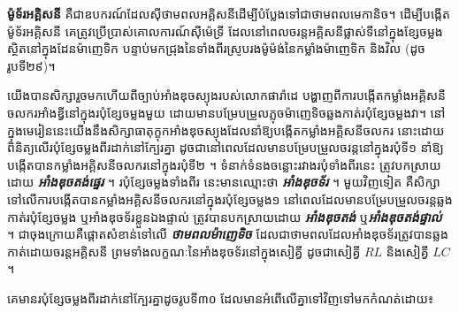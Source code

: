 
\textbf{\textcolor{brownheader}{ម៉ូទ័រអគ្គិសនី}} គឺជាឧបករណ៍ដែលស៊ីថាមពលអគ្គិសនីដើម្បីបំប្លែងទៅជាថាមពលមេកានិច។ ដើម្បីបង្កើតម៉ូទ័រអគ្គិសនី គេត្រូវប្រើប្រាស់គោលការណ៍ស៊ីម៉េទ្រី ដែលនៅពេលចរន្តអគ្គិសនីផ្លាស់ទីនៅក្នុងខ្សែចម្លងស្ថិតនៅក្នុងដែនម៉ាញេទិក បន្ទាប់មកជ្រុងនៃទាំងពីរស្រូបរងម៉ូម៉ង់នៃកម្លាំងម៉ាញេទិក និងវិល (ដូចរូបទី២៩)។

\vspace{0.5em}
\begin{center}
\end{center}

\clearpage

\tanbgdivider

យើងបានសិក្សារួចមកហើយពីច្បាប់អាំងឌុចស្យុងរបស់លោកផារ៉ាដេ បង្ហាញពីការបង្កើតកម្លាំងអគ្គិសនីចលករអាំងឌ្វីនៅក្នុងរបុំខ្សែចម្លងមួយ ដោយមានបម្រែបម្រួលភ្លុចម៉ាញេទិចឆ្លងកាត់របុំខ្សែចម្លងវា។ នៅក្នុងមេរៀននេះយើងនឹងសិក្សាធាតុក្ខុកអាំងឌុចស្យុងដែលនាំឱ្យបង្កើតកម្លាំងអគ្គិសនីចលករ នោះដោយពិនិត្យលើរបុំខ្សែចម្លងពីរដាក់នៅក្បែរគ្នា ដូចជានៅពេលដែលមានបម្រែបម្រួលចរន្តនៅក្នុងរបុំទី១ នាំឱ្យបង្កើតបានកម្លាំងអគ្គិសនីចលករនៅក្នុងរបុំទី២ ។ ទំនាក់ទំនងចន្លោះរវាងរបុំទាំងពីរនេះ ត្រូវបកស្រាយដោយ \textbf{\textit{អាំងឌុចតង់ផ្ទេរ}} ។ របុំខ្សែចម្លងទាំងពីរ នេះមានឈ្មោះថា \textbf{\textit{អាំងឌុចទ័រ}} ។ មួយវិញទៀត គឺសិក្សាទៅលើការបង្កើតបានកម្លាំងអគ្គិសនីចលករនៅក្នុងរបុំខ្សែចម្លង១ នៅពេលដែលមានបម្រែបម្រួលចរន្តឆ្លងកាត់របុំខ្សែចម្លង ឬអាំងឌុចទ័រខ្លួនឯងផ្ទាល់ ត្រូវបានបកស្រាយដោយ \textbf{\textit{អាំងឌុចតង់}} ឬ\textbf{\textit{អាំងឌុចតង់ផ្ទាល់}} ។ ជាចុងក្រោយគឺផ្តោតសំខាន់ទៅលើ \textbf{\textit{ថាមពលម៉ាញេទិច}} ដែលជាថាមពលដែលអាំងឌុចទ័រត្រូវបានឆ្លងកាត់ដោយចរន្តអគ្គិសនី ព្រមទាំងលក្ខណៈនៃអាំងឌុចទ័រនៅក្នុងសៀគ្វី ដូចជាសៀគ្វី $RL$ និងសៀគ្វី $LC$ ។


គេមានរបុំខ្សែចម្លងពីរដាក់នៅក្បែរគ្នាដូចរូបទី៣០ ដែលមានអំពើលើគ្នាទៅវិញទៅមកកំណត់ដោយ៖

